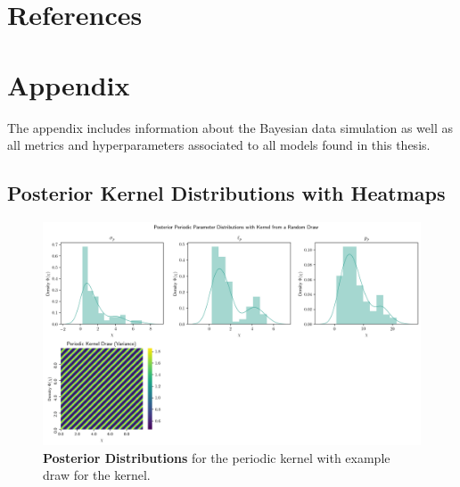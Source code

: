 \documentclass[11pt]{scrartcl}
\begin{document}

\clearpage
\section{References}
\printbibliography[heading=none]

\clearpage

\section{Appendix}
\label{sec:appendix}

The appendix includes information about the Bayesian data simulation as well as all metrics and hyperparameters associated to all models found in this thesis.

\subsection{Posterior Kernel Distributions with Heatmaps}
\label{sec:posterior_kernel_distributions_with_heatmaps}

\begin{figure}[!hbt]
	\center
	\includegraphics[width=1.2\textwidth,center]{img/gp/gp_kernel_posterior_periodic_zoomed.png}
	\caption{\textcolor{viridis5}{\textbf{Posterior Distributions}} for the periodic kernel with example draw for the kernel.}
	\label{fig:gp_kernel_posterior_periodic}
\end{figure}
\end{document}

